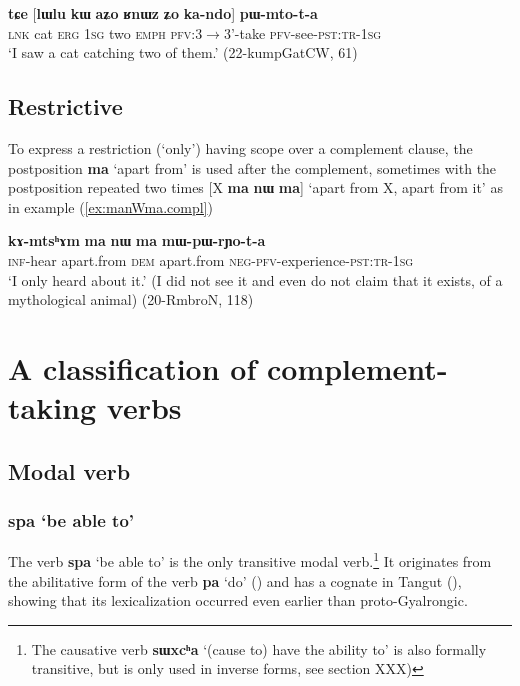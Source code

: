 \documentclass[oldfontcommands,oneside,a4paper,11pt]{article}
\newcommand{\ipa}[1]{\textbf{\phon#1}} %
\newcommand{\jpg}[2]{\ipa{#1} `#2'} %
\begin{document}
 \begin{exe}
\ex \label{ex:lWlu.kW.aZo}
\gll \ipa{tɕe} 	[\ipa{lɯlu} 	\ipa{kɯ} 	\ipa{aʑo} 	\ipa{ʁnɯz} 	\ipa{ʑo} 	\ipa{ka-ndo}] 	\ipa{pɯ-mto-t-a} \\
\textsc{lnk} cat \textsc{erg} \textsc{1sg} two \textsc{emph} \textsc{pfv}:3$\rightarrow$3'-take \textsc{pfv}-see-\textsc{pst:tr-1sg} \\
\glt `I saw a cat catching two of them.' (22-kumpGatCW, 61)
\end{exe}


  



 
\subsection{Restrictive} 
To express a restriction (`only') having scope over a complement clause, the postposition \ipa{ma} `apart from' is used after the complement, sometimes with the postposition repeated two times [X \ipa{ma} \ipa{nɯ} \ipa{ma}] `apart from X, apart from it' as in example (\ref{ex:manWma.compl})

\begin{exe}
\ex \label{ex:manWma.compl}
\gll \ipa{kɤ-mtsʰɤm} 	\ipa{ma} 	\ipa{nɯ} 	\ipa{ma} 	\ipa{mɯ-pɯ-rɲo-t-a} \\
\textsc{inf}-hear apart.from \textsc{dem} apart.from \textsc{neg-pfv}-experience-\textsc{pst:tr-1sg} \\
\glt `I only heard about it.' (I did not see it and even do not claim that it exists, of a mythological animal) (20-RmbroN, 118)
\end{exe}
 
  \section{A classification of complement-taking verbs} 
  \subsection{Modal verb}
  
    \subsubsection{\jpg{spa}{be able to}} \label{sec:spa}
The verb \jpg{spa}{be able to} is the only transitive modal verb.\footnote{The causative verb \jpg{sɯxcʰa}{(cause to) have the ability to} is also formally transitive, but is only used in inverse forms, see section XXX)} It originates from the abilitative form of the verb \ipa{pa} `do' (\citealt{jacques15causative}) and has a cognate in Tangut  (\citealt{jacques14esquisse}), showing that its lexicalization occurred even earlier than proto-Gyalrongic.
\end{document}
